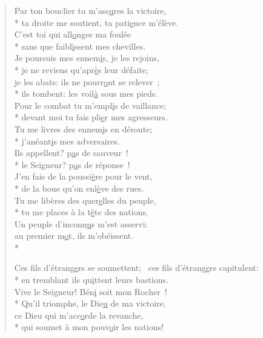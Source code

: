 \begin{verse}
Par ton bouclier tu m’ass\underline{u}res la victoire, \\*
ta droite me soutient, ta pati\underline{e}nce m’élève. \\
C’est toi qui all\underline{o}nges ma foulée \\*
sans que faibl\underline{i}ssent mes chevilles. \\

Je poursuis mes ennem\underline{i}s, je les rejoins, \\*
je ne reviens qu’apr\underline{è}s leur défaite; \\
je les abats: ils ne pourr\underline{o}nt se relever ; \\*
ils tombent: les voil\underline{à} sous mes pieds. \\

Pour le combat tu m’empl\underline{i}s de vaillance; \\*
devant moi tu fais pli\underline{e}r mes agresseurs. \\
Tu me livres des ennem\underline{i}s en déroute; \\*
j’anéant\underline{i}s mes adversaires. \\

Ils appellent? p\underline{a}s de sauveur ! \\*
le Seigneur? p\underline{a}s de réponse ! \\
J’en fais de la poussi\underline{è}re pour le vent, \\*
de la boue qu’on enl\underline{è}ve des rues. \\

Tu me libères des quer\underline{e}lles du peuple, \\*
tu me places à la t\underline{ê}te des nations. \\
Un peuple d’inconn\underline{u}s m’est asservi: \\
au premier m\underline{o}t, ils m’obéissent. \\*

Ces fils d’étrang\underline{e}rs se soumettent;~\psalmdagger
{}ces fils d’étrang\underline{e}rs capitulent: \\*
en tremblant ils qu\underline{i}ttent leurs bastions. \\

Vive le Seigneur! Bén\underline{i} soit mon Rocher ! \\*
Qu’il triomphe, le Die\underline{u} de ma victoire, \\
ce Dieu qui m’acc\underline{o}rde la revanche, \\*
qui soumet à mon pouv\underline{o}ir les nations! \\


\end{verse}
